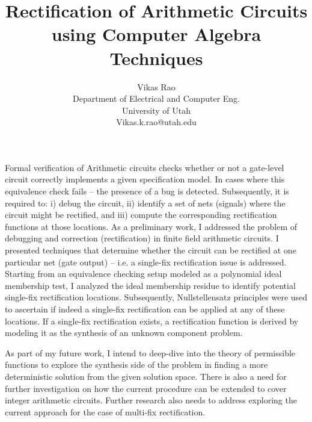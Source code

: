 \documentclass[2pt]{article}
\title{{R}ectification of {A}rithmetic {C}ircuits using {C}omputer {A}lgebra {T}echniques}
\author{Vikas Rao\\
Department of  Electrical and Computer Eng.\\
University of Utah\\Vikas.k.rao@utah.edu }
\date{}
\begin{document}
\maketitle
Formal verification of Arithmetic circuits checks whether 
or not a gate-level circuit correctly implements a
given specification model. In cases where this equivalence
check fails – the presence of a bug is detected. Subsequently, it is required
to: i) debug the circuit, ii) identify a set of nets (signals)
where the circuit might be rectified, and iii) compute the
corresponding rectification functions at those locations. As a preliminary work, 
I addressed the problem of debugging
and correction (rectification) in finite field arithmetic circuits\cite{vkrao:fmcad18}.
I presented techniques that
determine whether the circuit can be rectified at one particular
net (gate output) – i.e. a single-fix rectification issue is addressed.
Starting from an equivalence checking setup modeled as
a polynomial ideal membership test, I analyzed the ideal
membership residue to identify potential single-fix rectification
locations. Subsequently, Nullstellensatz principles were used to
ascertain if indeed a single-fix rectification can be applied at
any of these locations. If a single-fix rectification exists, a
rectification function is derived by modeling it as the synthesis
of an unknown component problem\cite{vkrao:iwls18}.  

As part of my future work, I intend to deep-dive into the theory of
permissible functions to explore the synthesis side of the 
problem in finding a more deterministic solution from the given solution space.
There is also a need for further investigation on 
how the current procedure can be extended to cover integer 
arithmetic circuits. Further research also needs to address 
exploring the current approach for the case of multi-fix rectification. 




\end{document}
